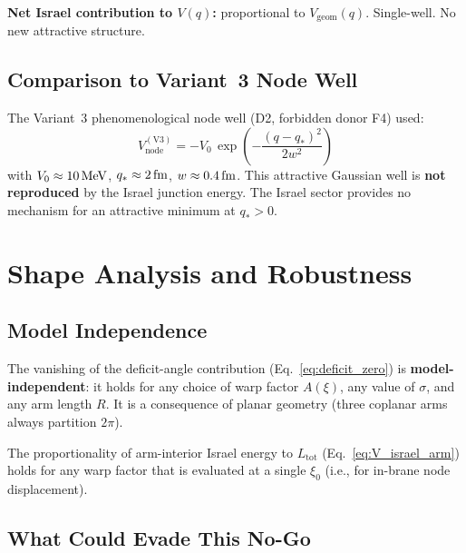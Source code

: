 \textbf{Net Israel contribution to $V(q)$:} proportional to
$V_{\mathrm{geom}}(q)$. Single-well. No new attractive structure.

\subsection{Comparison to Variant~3 Node Well}

The Variant~3 phenomenological node well (D2, forbidden donor F4)
used:
\begin{equation}
    V_{\mathrm{node}}^{(\mathrm{V3})} = -V_0\,
    \exp\!\left(-\frac{(q - q_*)^2}{2w^2}\right)
\end{equation}
with $V_0 \approx 10\,\mathrm{MeV}$, $q_* \approx 2\,\mathrm{fm}$, $w \approx 0.4\,\mathrm{fm}$.
This attractive Gaussian well is \textbf{not reproduced} by the Israel
junction energy. The Israel sector provides no mechanism for an
attractive minimum at $q_* > 0$.

\section{Shape Analysis and Robustness}
\label{sec:P2WP2:shape}

\subsection{Model Independence}

The vanishing of the deficit-angle contribution
(Eq.~\eqref{eq:deficit_zero}) is \textbf{model-independent}:
it holds for any choice of warp factor $A(\xi)$, any value of
$\sigma$, and any arm length $R$. It is a consequence of planar
geometry (three coplanar arms always partition $2\pi$).

The proportionality of arm-interior Israel energy to $L_{\mathrm{tot}}$
(Eq.~\eqref{eq:V_israel_arm}) holds for any warp factor that is
evaluated at a single $\xi_0$ (i.e., for in-brane node displacement).

\subsection{What Could Evade This No-Go}

